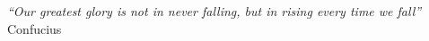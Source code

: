 \cleardoublepage
\thispagestyle{plain}

\vspace*{8cm}

\begin{flushright}
   \textsl{``Our greatest glory is not in never falling, but in rising every time we fall''}\\
\vspace*{1.5cm}
    Confucius
\end{flushright}
